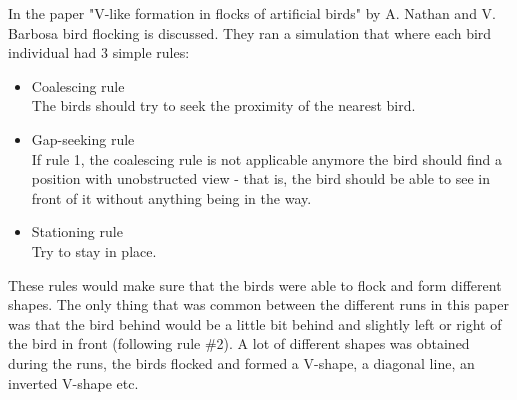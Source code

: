 In the paper "V-like formation in flocks of artificial birds" by A. Nathan and V. Barbosa \cite{Nathan2008} bird flocking is discussed. They ran a simulation that where each bird individual had 3 simple rules: 
\begin{itemize}
    \item Coalescing rule \\
        The birds should try to seek the proximity of the nearest bird.
    \item Gap-seeking rule \\
        If rule 1, the coalescing rule is not applicable anymore the bird should find a position with unobstructed view -  that is, the bird should be able to see in front of it without anything being in the way.
    \item Stationing rule \\
        Try to stay in place.
\end{itemize}
These rules would make sure that the birds were able to flock and form different shapes. The only thing that was common between the different runs in this paper was that the bird behind would be a little bit behind and slightly left or right of the bird in front (following rule \#2). A lot of different shapes was obtained during the runs, the birds flocked and formed a V-shape, a diagonal line, an inverted V-shape etc.

